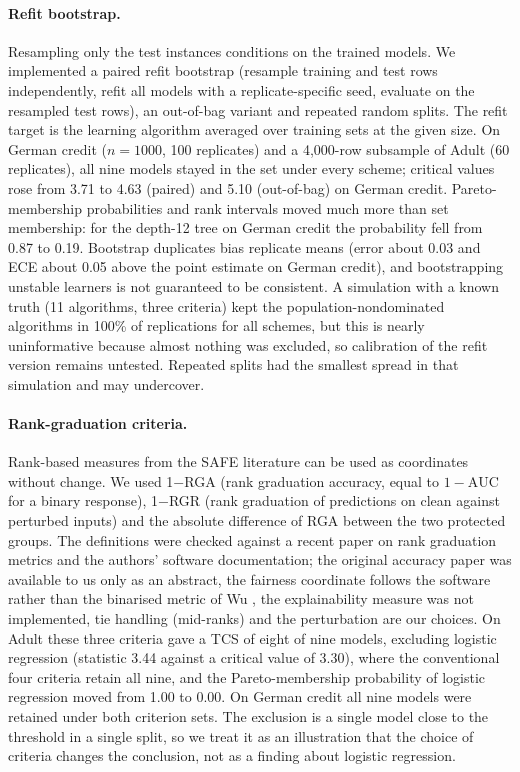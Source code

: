 \documentclass[11pt,a4paper]{article}
\begin{document}
\paragraph{Refit bootstrap.} Resampling only the test instances conditions on the trained models. We implemented a paired refit bootstrap (resample training and test rows independently, refit all models with a replicate-specific seed, evaluate on the resampled test rows), an out-of-bag variant and repeated random splits. The refit target is the learning algorithm averaged over training sets at the given size. On German credit ($n=1000$, 100 replicates) and a 4,000-row subsample of Adult (60 replicates), all nine models stayed in the set under every scheme; critical values rose from 3.71 to 4.63 (paired) and 5.10 (out-of-bag) on German credit. Pareto-membership probabilities and rank intervals moved much more than set membership: for the depth-12 tree on German credit the probability fell from 0.87 to 0.19. Bootstrap duplicates bias replicate means (error about 0.03 and ECE about 0.05 above the point estimate on German credit), and bootstrapping unstable learners is not guaranteed to be consistent. A simulation with a known truth (11 algorithms, three criteria) kept the population-nondominated algorithms in 100\% of replications for all schemes, but this is nearly uninformative because almost nothing was excluded, so calibration of the refit version remains untested. Repeated splits had the smallest spread in that simulation and may undercover.

\paragraph{Rank-graduation criteria.} Rank-based measures from the SAFE literature can be used as coordinates without change. We used 1$-$RGA (rank graduation accuracy, equal to $1-\mathrm{AUC}$ for a binary response), 1$-$RGR (rank graduation of predictions on clean against perturbed inputs) and the absolute difference of RGA between the two protected groups. The definitions were checked against a recent paper on rank graduation metrics \citep{auricchio2025} and the authors' software documentation; the original accuracy paper \citep{raffinetti2023} was available to us only as an abstract, the fairness coordinate follows the software rather than the binarised metric of Wu \citeyearpar{wu2026safe}, the explainability measure was not implemented, tie handling (mid-ranks) and the perturbation are our choices. On Adult these three criteria gave a TCS of eight of nine models, excluding logistic regression (statistic 3.44 against a critical value of 3.30), where the conventional four criteria retain all nine, and the Pareto-membership probability of logistic regression moved from 1.00 to 0.00. On German credit all nine models were retained under both criterion sets. The exclusion is a single model close to the threshold in a single split, so we treat it as an illustration that the choice of criteria changes the conclusion, not as a finding about logistic regression.
\end{document}
